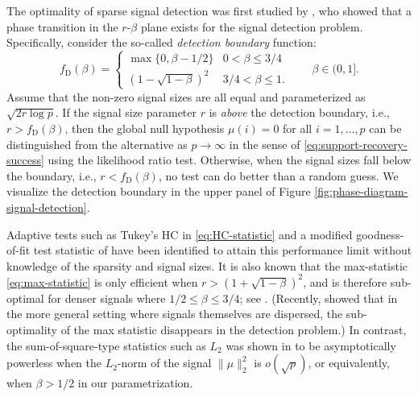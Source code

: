 
The optimality of sparse signal detection was first studied by \citet{ingster1998minimax}, who showed that a phase transition in the $r$-$\beta$ plane exists for the signal detection problem. 
Specifically, consider the so-called {\em detection boundary} function:
\begin{equation} \label{eq:detection-boundary-large-signals}
    f_{\mathrm{D}}(\beta) = 
    \begin{cases}
        \max\{0,\beta -1/2\} & 0<\beta\le 3/4\\
        \left(1 - \sqrt{1-\beta}\right)^2 & 3/4 < \beta \le 1.
    \end{cases}
    \quad\quad \beta\in (0,1].
\end{equation} 
Assume that the non-zero signal sizes are all equal and parameterized as $\sqrt{2{r}\log{p}}$.
If the signal size parameter $r$ is {\em above} the detection boundary, i.e., $r>f_{\mathrm{D}}(\beta)$, then the global null 
hypothesis $\mu(i)=0$ for all $i=1,\dots,p$ can be distinguished from the alternative as $p\to\infty$ in the sense of \eqref{eq:support-recovery-success} using the likelihood ratio test.  Otherwise, when the signal sizes fall below the boundary, i.e., $r< f_{\mathrm{D}}(\beta)$, no test can do better than a 
random guess.  We visualize the detection boundary in the upper panel of Figure
\ref{fig:phase-diagram-signal-detection}.

Adaptive tests such as Tukey's \ac{HC} in \eqref{eq:HC-statistic} \citep{donoho2004higher} and a modified 
goodness-of-fit test statistic of \citet{zhang2002powerful} have been identified to attain this performance limit 
without knowledge of the sparsity and signal sizes. 
It is also known that the max-statistic \eqref{eq:max-statistic} is only efficient when $r>(1+\sqrt{1-\beta})^2$, and is therefore sub-optimal for denser signals where $1/2\le\beta\le 3/4$; see \cite{cai2011optimal}. 
(Recently, \cite{li2020optimality} showed that in the more general setting where signals themselves are dispersed, the sub-optimality of the max statistic disappears in the detection problem.)
In contrast, the sum-of-square-type statistics such as $L_2$ was shown in \cite{fan1996test} to be asymptotically powerless when the $L_2$-norm of the signal $\|\mu\|_2^2$ is $o(\sqrt{p})$, or equivalently, when $\beta>1/2$ in our parametrization.

